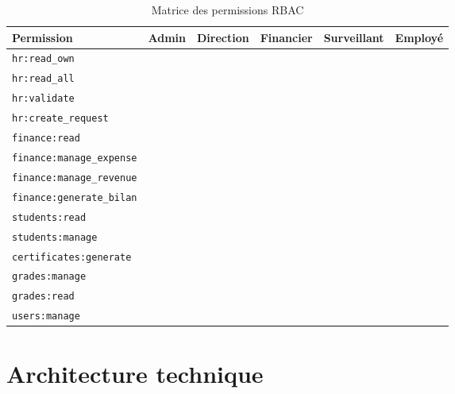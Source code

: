 \documentclass[12pt,a4paper]{report}
\newcommand{\cmark}{\ding{51}}  %
\newcommand{\xmark}{\ding{55}}  %
\begin{document}
\begin{table}[H]
\centering
\caption{Matrice des permissions RBAC}
\label{tab:rbac}
\begin{tabularx}{\textwidth}{l*{5}{c}}
\toprule
\textbf{Permission} & \textbf{Admin} & \textbf{Direction} & \textbf{Financier} & \textbf{Surveillant} & \textbf{Employé} \\
\midrule
\texttt{hr:read\_own}         & \cmark & \cmark & \xmark & \xmark & \cmark \\
\texttt{hr:read\_all}         & \cmark & \cmark & \xmark & \xmark & \xmark \\
\texttt{hr:validate}          & \cmark & \cmark & \xmark & \xmark & \xmark \\
\texttt{hr:create\_request}   & \cmark & \xmark & \xmark & \xmark & \cmark \\
\midrule
\texttt{finance:read}               & \cmark & \cmark & \cmark & \xmark & \xmark \\
\texttt{finance:manage\_expense}     & \cmark & \xmark & \cmark & \xmark & \xmark \\
\texttt{finance:manage\_revenue}     & \cmark & \xmark & \cmark & \xmark & \xmark \\
\texttt{finance:generate\_bilan}     & \cmark & \cmark & \cmark & \xmark & \xmark \\
\midrule
\texttt{students:read}        & \cmark & \cmark & \xmark & \cmark & \xmark \\
\texttt{students:manage}      & \cmark & \cmark & \xmark & \cmark & \xmark \\
\midrule
\texttt{certificates:generate} & \cmark & \cmark & \xmark & \xmark & \xmark \\
\texttt{grades:manage}        & \cmark & \xmark & \xmark & \xmark & \xmark \\
\texttt{grades:read}          & \cmark & \cmark & \xmark & \xmark & \xmark \\
\midrule
\texttt{users:manage}         & \cmark & \xmark & \xmark & \xmark & \xmark \\
\bottomrule
\end{tabularx}
\end{table}

\chapter{Architecture technique}
\end{document}
